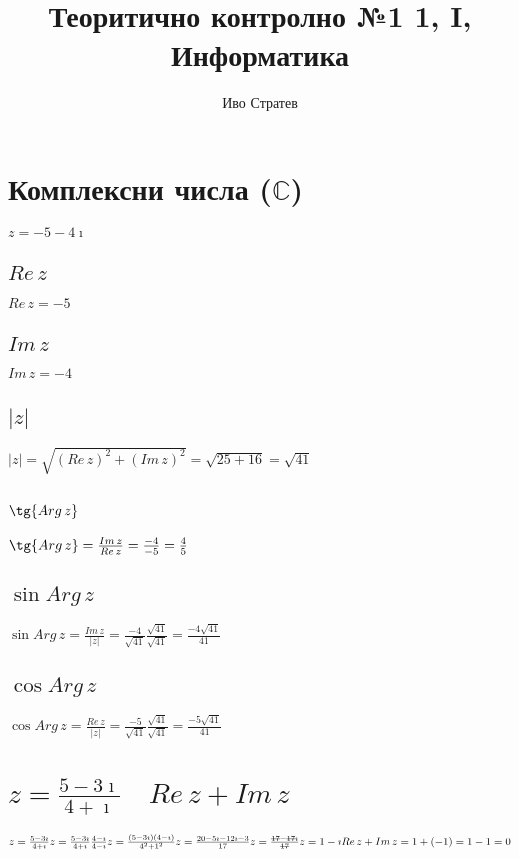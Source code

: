 \documentclass{article}
\title{Теоритично контролно №1 1, I, Информатика}
\author{Иво Стратев}
\newcommand{\stkout}[1]{\ifmmode\text{\sout{\ensuremath{#1}}}\else\sout{#1}\fi}
\begin{document}
    \maketitle
    \section{Комплексни числа (\(\mathbb{C}\))}
    \(z = -5 -4\imath\)
    \subsection{\(Re\,z\)}
    \(Re\,z = -5\)
    \subsection{\(Im\,z\)}
    \(Im\,z = -4\)
    \subsection{\(|z|\)}
    \(|z| = \sqrt{(Re\,z)^2 + (Im\,z)^2} = \sqrt{25 + 16} = \sqrt{41}\)
    \subsection{\(\tg{Arg\,z}\)}
    \(\tg{Arg\,z} = \frac{Im\,z}{Re\,z} = \frac{-4}{-5} = \frac{4}{5}\)
    \subsection{\(\sin{Arg\,z}\)}
    \(\sin{Arg\,z} = \frac{Im\,z}{|z|} = \frac{-4}{\sqrt{41}}\frac{\sqrt{41}}{\sqrt{41}} = \frac{-4\sqrt{41}}{41}\)
    \subsection{\(\cos{Arg\,z}\)}
    \(\cos{Arg\,z} = \frac{Re\,z}{|z|} = \frac{-5}{\sqrt{41}}\frac{\sqrt{41}}{\sqrt{41}} = \frac{-5\sqrt{41}}{41}\)
    \section{\(z = \frac{5 - 3\imath}{4 + \imath} \quad Re\,z + Im\,z\)}
    \(z = \frac{5 - 3\imath}{4 + \imath}\\
    \\
    z = \frac{5 - 3\imath}{4 + \imath} \frac{4 - \imath}{4 - \imath}\\
    \\
    z = \frac{(5 - 3\imath)(4 - \imath)}{4^2 + 1^2}\\
    \\
    z = \frac{20 - 5\imath - 12\imath - 3}{17}\\
    \\
    z = \frac{\stkout{17} - \stkout{17}\imath}{\stkout{17}}\\
    \\
    z = 1 - \imath\\
    \\
    Re\,z + Im\,z = 1 + (-1) = 1 - 1 = 0\)
\end{document}

